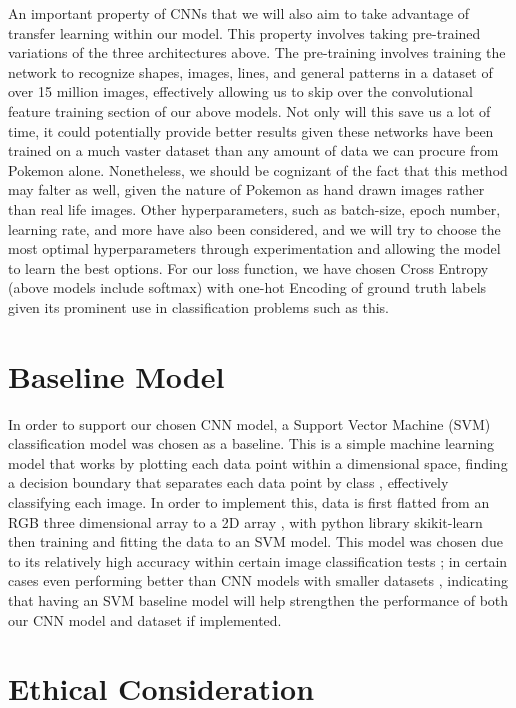 \documentclass{article} %
\begin{document}
An important property of CNNs that we will also aim to take advantage of transfer learning within our model. This property involves taking pre-trained variations of the three architectures above. The pre-training involves training the network to recognize shapes, images, lines, and general patterns in a dataset of over 15 million images, effectively allowing us to skip over the convolutional feature training section of our above models. Not only will this save us a lot of time, it could potentially provide better results given these networks have been trained on a much vaster dataset than any amount of data we can procure from Pokemon alone. Nonetheless, we should be cognizant of the fact that this method may falter as well, given the nature of Pokemon as hand drawn images rather than real life images. Other hyperparameters, such as batch-size, epoch number, learning rate, and more have also been considered, and we will try to choose the most optimal hyperparameters through experimentation and allowing the model to learn the best options. For our loss function, we have chosen Cross Entropy (above models include softmax) with one-hot Encoding of ground truth labels given its prominent use in classification problems such as this.

\section {Baseline Model}

In order to support our chosen CNN model, a Support Vector Machine (SVM) classification model was chosen as a baseline. This is a simple machine learning model that works by plotting each data point within a dimensional space, finding a decision boundary that separates each data point by class \citep{shanmukh_2021}, effectively classifying each image. In order to implement this, data is first flatted from an RGB three dimensional array to a 2D array \citep{varma_2020}, with python library skikit-learn then training and fitting the data to an SVM model. This model was chosen due to its relatively high accuracy within certain image classification tests \citep{scikit} \citep{WANG202161}; in certain cases even performing better than CNN models with smaller datasets \citep{WANG202161}, indicating that having an SVM baseline model will help strengthen the performance of both our CNN model and dataset if implemented.

\section {Ethical Consideration}
\end{document}
